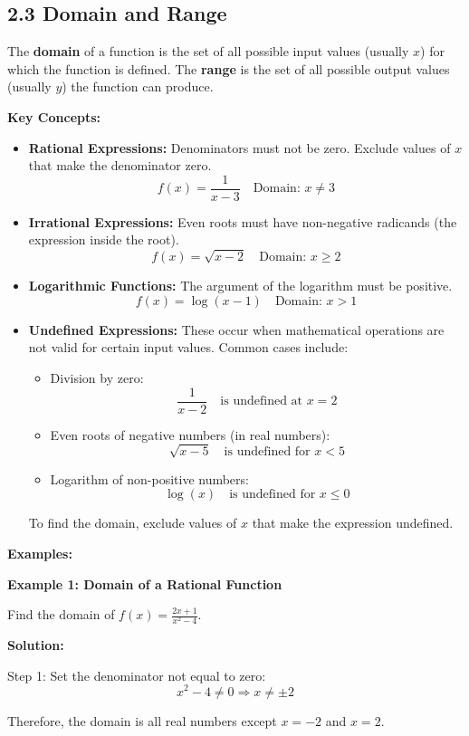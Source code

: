 
\subsection*{2.3 Domain and Range}

The \textbf{domain} of a function is the set of all possible input values (usually \(x\)) for which the function is defined.  
The \textbf{range} is the set of all possible output values (usually \(y\)) the function can produce.

\textbf{Key Concepts:}
\begin{itemize}
    \item \textbf{Rational Expressions:} Denominators must not be zero. Exclude values of \(x\) that make the denominator zero.
    \[
    f(x) = \frac{1}{x - 3} \quad \text{Domain: } x \neq 3
    \]

    \item \textbf{Irrational Expressions:} Even roots must have non-negative radicands (the expression inside the root).
    \[
    f(x) = \sqrt{x - 2} \quad \text{Domain: } x \geq 2
    \]

    \item \textbf{Logarithmic Functions:} The argument of the logarithm must be positive.
    \[
    f(x) = \log(x - 1) \quad \text{Domain: } x > 1
    \]
    \item \textbf{Undefined Expressions:} These occur when mathematical operations are not valid for certain input values. Common cases include:
\begin{itemize}
    \item Division by zero:
    \[
    \frac{1}{x - 2} \quad \text{is undefined at } x = 2
    \]
    \item Even roots of negative numbers (in real numbers):
    \[
    \sqrt{x - 5} \quad \text{is undefined for } x < 5
    \]
    \item Logarithm of non-positive numbers:
    \[
    \log(x) \quad \text{is undefined for } x \leq 0
    \]
\end{itemize}
To find the domain, exclude values of \(x\) that make the expression undefined.

\end{itemize}

\textbf{Examples:}

\begin{flushleft}
\textbf{Example 1: Domain of a Rational Function}

Find the domain of \( f(x) = \frac{2x + 1}{x^2 - 4} \).

\textbf{Solution:} \vspace{0.2cm}

Step 1: Set the denominator not equal to zero:
\[
x^2 - 4 \neq 0 \Rightarrow x \neq \pm2
\]

Therefore, the domain is all real numbers except \( x = -2 \) and \( x = 2 \).
\end{flushleft}

